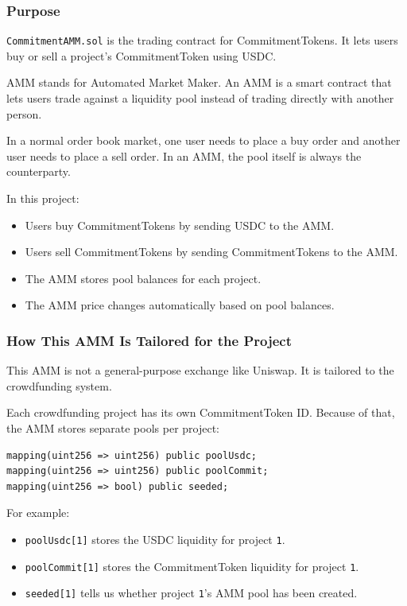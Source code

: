 \documentclass[11pt,a4paper]{article}
\begin{document}
\subsubsection{Purpose}

\texttt{CommitmentAMM.sol} is the trading contract for CommitmentTokens. It lets users buy or sell a project's CommitmentToken using USDC.

AMM stands for Automated Market Maker. An AMM is a smart contract that lets users trade against a liquidity pool instead of trading directly with another person.

In a normal order book market, one user needs to place a buy order and another user needs to place a sell order. In an AMM, the pool itself is always the counterparty.

In this project:

\begin{itemize}
  \item Users buy CommitmentTokens by sending USDC to the AMM.
  \item Users sell CommitmentTokens by sending CommitmentTokens to the AMM.
  \item The AMM stores pool balances for each project.
  \item The AMM price changes automatically based on pool balances.
\end{itemize}

\subsubsection{How This AMM Is Tailored for the Project}

This AMM is not a general-purpose exchange like Uniswap. It is tailored to the crowdfunding system.

Each crowdfunding project has its own CommitmentToken ID. Because of that, the AMM stores separate pools per project:

\begin{lstlisting}
mapping(uint256 => uint256) public poolUsdc;
mapping(uint256 => uint256) public poolCommit;
mapping(uint256 => bool) public seeded;
\end{lstlisting}

For example:

\begin{itemize}
  \item \texttt{poolUsdc[1]} stores the USDC liquidity for project \texttt{1}.
  \item \texttt{poolCommit[1]} stores the CommitmentToken liquidity for project \texttt{1}.
  \item \texttt{seeded[1]} tells us whether project \texttt{1}'s AMM pool has been created.
\end{itemize}
\end{document}
